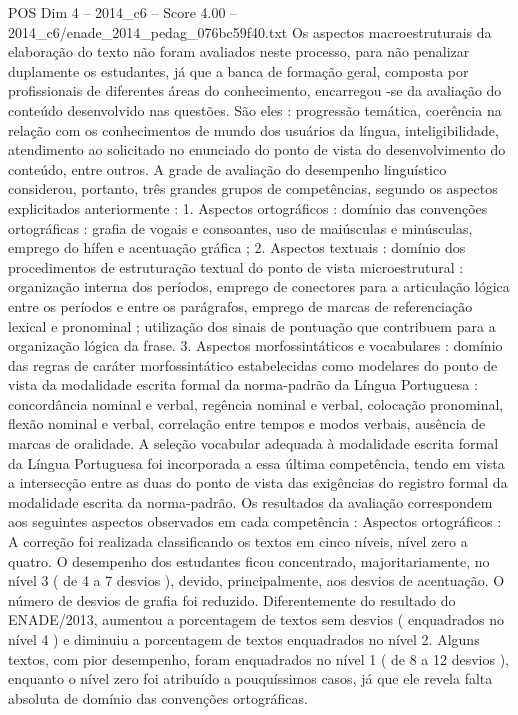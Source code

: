 \begin{textsample}{POS Dim 4 – 2014\_c6 – Score 4.00 – 2014\_c6/enade\_2014\_pedag\_076bc59f40.txt}
Os aspectos macroestruturais da elaboração do texto não foram avaliados neste processo, para não penalizar duplamente os estudantes, já que a banca de formação geral, composta por profissionais de diferentes áreas do conhecimento, encarregou -se da avaliação do conteúdo desenvolvido nas questões.
São eles : progressão temática, coerência na relação com os conhecimentos de mundo dos usuários da língua, inteligibilidade, atendimento ao solicitado no enunciado do ponto de vista do desenvolvimento do conteúdo, entre outros.
A grade de avaliação do desempenho linguístico considerou, portanto, três grandes grupos de competências, segundo os aspectos explicitados anteriormente : 1.
Aspectos ortográficos : domínio das convenções ortográficas : grafia de vogais e consoantes, uso de maiúsculas e minúsculas, emprego do hífen e acentuação gráfica ; 2.
Aspectos textuais : domínio dos procedimentos de estruturação textual do ponto de vista microestrutural : organização interna dos períodos, emprego de conectores para a articulação lógica entre os períodos e entre os parágrafos, emprego de marcas de referenciação lexical e pronominal ; utilização dos sinais de pontuação que contribuem para a organização lógica da frase. 3.
Aspectos morfossintáticos e vocabulares : domínio das regras de caráter morfossintático estabelecidas como modelares do ponto de vista da modalidade escrita formal da norma-padrão da Língua Portuguesa : concordância nominal e verbal, regência nominal e verbal, colocação pronominal, flexão nominal e verbal, correlação entre tempos e modos verbais, ausência de marcas de oralidade.
A seleção vocabular adequada à modalidade escrita formal da Língua Portuguesa foi incorporada a essa última competência, tendo em vista a intersecção entre as duas do ponto de vista das exigências do registro formal da modalidade escrita da norma-padrão.
Os resultados da avaliação correspondem aos seguintes aspectos observados em cada competência : Aspectos ortográficos : A correção foi realizada classificando os textos em cinco níveis, nível zero a quatro.
O desempenho dos estudantes ficou concentrado, majoritariamente, no nível 3 ( de 4 a 7 desvios ), devido, principalmente, aos desvios de acentuação.
O número de desvios de grafia foi reduzido.
Diferentemente do resultado do ENADE/2013, aumentou a porcentagem de textos sem desvios ( enquadrados no nível 4 ) e diminuiu a porcentagem de textos enquadrados no nível 2.
Alguns textos, com pior desempenho, foram enquadrados no nível 1 ( de 8 a 12 desvios ), enquanto o nível zero foi atribuído a pouquíssimos casos, já que ele revela falta absoluta de domínio das convenções ortográficas.

\end{textsample}

